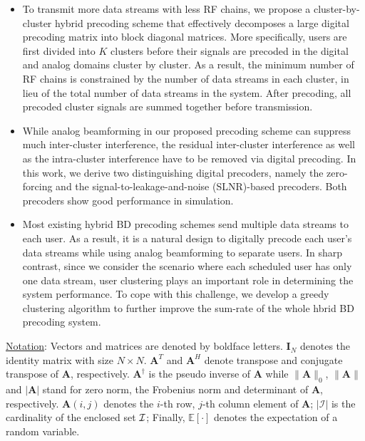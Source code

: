 \documentclass[conference]{IEEEtran}
\begin{document}
\begin{itemize}[leftmargin=*]
\item To transmit more data streams with less RF chains, we propose a cluster-by-cluster hybrid precoding scheme that effectively decomposes a large digital precoding matrix into block diagonal matrices. More specifically, users are first divided into $K$ clusters before their signals are precoded in the digital and analog domains cluster by cluster. As a result, the minimum number of RF chains is constrained by the number of data streams in each cluster, in lieu of the total number of data streams in the system. After precoding, all precoded cluster signals are summed together before transmission.\
\item While analog beamforming in our proposed precoding scheme can suppress much inter-cluster interference, the residual inter-cluster interference as well as the intra-cluster interference have to be removed via digital precoding. In this work, we derive two distinguishing digital precoders, namely the zero-forcing and the signal-to-leakage-and-noise (SLNR)-based precoders. Both precoders show good performance in simulation.
\item Most existing hybrid BD precoding schemes send multiple data streams to each user. As a result, it is a natural design to digitally precode each user's data streams while using analog beamforming to separate users. In sharp contrast, since we consider the scenario where each scheduled user has only one data stream, user clustering plays an important role in determining the system performance. To cope with this challenge, we develop a greedy clustering algorithm to further improve the sum-rate of the whole hbrid BD precoding system.
\end{itemize}


\underline{Notation}: Vectors and matrices are denoted by boldface letters. $\bm{I}_N$ denotes the identity matrix with size $N\times N$. ${\bm A}^T$ and ${\bm A}^H$ denote transpose and conjugate transpose of ${\bm A}$, respectively. $\bm{A}^\dagger$ is the pseudo inverse of $\bm{A}$ while $\|\bm{A}\|_0$, $\|\bm{A}\| $ and $|\bm{A}|$ stand for zero norm, the Frobenius norm and determinant of ${\bm A}$, respectively. $\bm{A}(i,j)$ denotes the $i$-th row, $j$-th column element of ${\bm A}$; $|\mathcal{I}|$ is the cardinality of the enclosed set ${\cal I}$; Finally, $\mathbb{E}[\cdot] $ denotes the expectation of a random variable.
\end{document}
